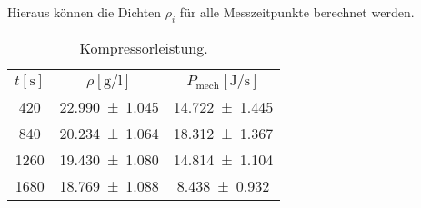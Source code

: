 Hieraus können die Dichten $\rho_i$ für alle Messzeitpunkte berechnet werden.
\begin{table}
  \centering
  \caption{Kompressorleistung.}
  \label{tab:tabelle5}
\begin{tabular}{c c c}
  \toprule
  {$t [\si{\second}]$} & {$\rho [\si{\gram\per\litre}]$} & {$P_{\text{mech}} [\si{\joule\per\second}]$}\\
  \midrule
  \num{420} & \num{22.990 +- 1.045} & \num{14.722 +- 1.445} \\
  \num{840} & \num{20.234 +- 1.064} & \num{18.312 +- 1.367} \\
  \num{1260} & \num{19.430 +- 1.080} & \num{14.814 +- 1.104} \\
  \num{1680} & \num{18.769 +- 1.088} & \num{8.438 +- 0.932} \\
  \bottomrule
\end{tabular}
\end{table}
